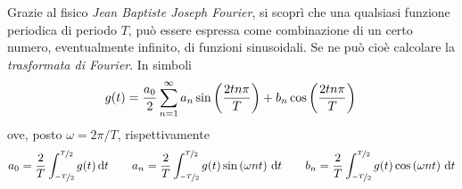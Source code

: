 \documentclass{subfiles}
\begin{document}
Grazie al fisico \emph{Jean Baptiste Joseph Fourier}, si scoprì che una qualsiasi funzione periodica di periodo \(T\),
può essere espressa come combinazione di un certo numero, eventualmente infinito, di funzioni sinusoidali.
Se ne può cioè calcolare la \emph{trasformata di Fourier}. In simboli
\begin{equation}
    g(t) = \frac{a_{0}}{2} \sum{n = 1}{\infty}{a_{n} \sin{\frac{2tn\pi}{T}} + b_{n} \cos{\frac{2tn\pi}{T}}} \\
\end{equation}
ove, posto \(\omega = 2\pi / T\), rispettivamente
\[
    a_{0} = \frac{2}{T} \int{\nicefrac{-T}{2}}{\nicefrac{T}{2}}{g(t)}{t}                 \qquad
    a_{n} = \frac{2}{T} \int{\nicefrac{-T}{2}}{\nicefrac{T}{2}}{g(t) \sin{\omega nt}}{t} \qquad
    b_{n} = \frac{2}{T} \int{\nicefrac{-T}{2}}{\nicefrac{T}{2}}{g(t) \cos{\omega nt}}{t}
\]
\end{document}
